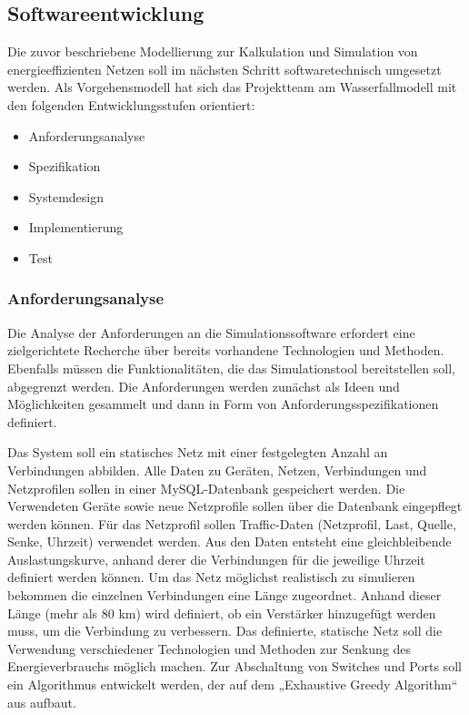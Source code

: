 \subsection{Softwareentwicklung}\label{subsec:VorgSoftwareEng}
Die zuvor beschriebene Modellierung zur Kalkulation und Simulation von energieeffizienten Netzen soll im nächsten Schritt softwaretechnisch umgesetzt werden. Als Vorgehensmodell hat sich das Projektteam am Wasserfallmodell mit den folgenden Entwicklungsstufen orientiert:
\begin{itemize}
\item Anforderungsanalyse
\item Spezifikation
\item Systemdesign
\item Implementierung
\item Test
\end{itemize}

\subsubsection{Anforderungsanalyse}
Die Analyse der Anforderungen an die Simulationssoftware erfordert eine zielgerichtete Recherche über bereits vorhandene Technologien und Methoden. Ebenfalls müssen die Funktionalitäten, die das Simulationstool bereitstellen soll, abgegrenzt werden. Die Anforderungen werden zunächst als Ideen und Möglichkeiten gesammelt und dann in Form von Anforderungsspezifikationen definiert. 

Das System soll ein statisches Netz mit einer festgelegten Anzahl an Verbindungen abbilden. Alle Daten zu Geräten, Netzen, Verbindungen und Netzprofilen sollen in einer MySQL-Datenbank gespeichert werden. Die Verwendeten Geräte sowie neue Netzprofile sollen über die Datenbank eingepflegt werden können. Für das Netzprofil sollen Traffic-Daten (Netzprofil, Last, Quelle, Senke, Uhrzeit) verwendet werden. Aus den Daten entsteht eine gleichbleibende Auslastungskurve, anhand derer die Verbindungen für die jeweilige Uhrzeit definiert werden können. Um das Netz möglichst realistisch zu simulieren bekommen die einzelnen Verbindungen eine Länge zugeordnet. Anhand dieser Länge (mehr als 80 km) wird definiert, ob ein Verstärker hinzugefügt werden muss, um die Verbindung zu verbessern. Das definierte, statische Netz soll die Verwendung verschiedener Technologien und Methoden zur Senkung des Energieverbrauchs möglich machen. Zur Abschaltung von Switches und Ports soll ein Algorithmus entwickelt werden, der auf dem „Exhaustive Greedy Algorithm“ aus \cite{fisher} aufbaut.

